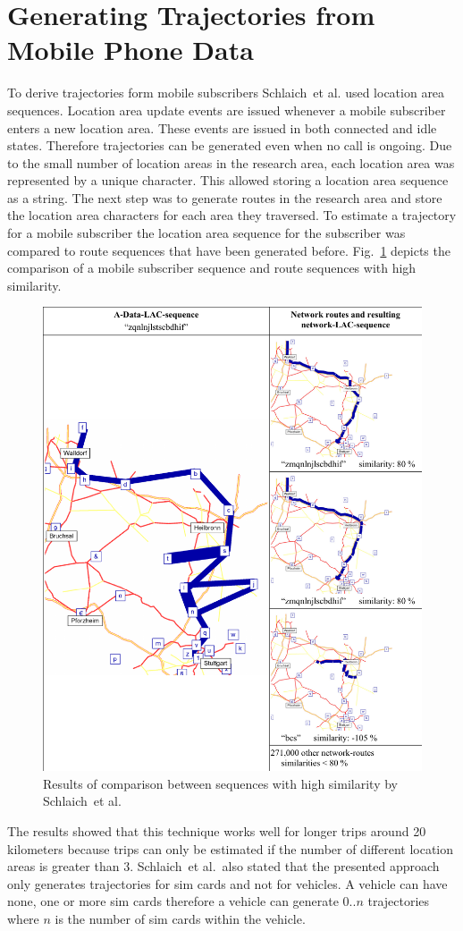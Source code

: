 \section{Generating Trajectories from Mobile Phone Data}
To derive trajectories form mobile subscribers Schlaich~et al. \cite{Schlaich2010a} used location area sequences. Location area update events are issued whenever a mobile subscriber enters a new location area. These events are issued in both connected and idle states. Therefore trajectories can be generated even when no call is ongoing. Due to the small number of location areas in the research area, each location area was represented by a unique character. This allowed storing a location area sequence as a string. The next step was to generate routes in the research area and store the location area characters for each area they traversed. To estimate a trajectory for a mobile subscriber the location area sequence for the subscriber was compared to route sequences that have been generated before. Fig.\ \ref{fig:schlaichcomp} depicts the comparison of a mobile subscriber sequence and route sequences with high similarity.
\begin{figure}
\centering
\includegraphics[width=0.7\linewidth]{./images/schlaichcomp.pdf}
\caption{Results of comparison between sequences with high similarity by Schlaich~et al.\ \cite{Schlaich2010a}}
\label{fig:schlaichcomp}
\end{figure}
The results showed that this technique works well for longer trips around 20 kilometers because trips can only be estimated if the number of different location areas is greater than 3. Schlaich~et al.\ also stated that the presented approach only generates trajectories for sim cards and not for vehicles. A vehicle can have none, one or more sim cards therefore a vehicle can generate $0..n$ trajectories where $n$ is the number of sim cards within the vehicle.


